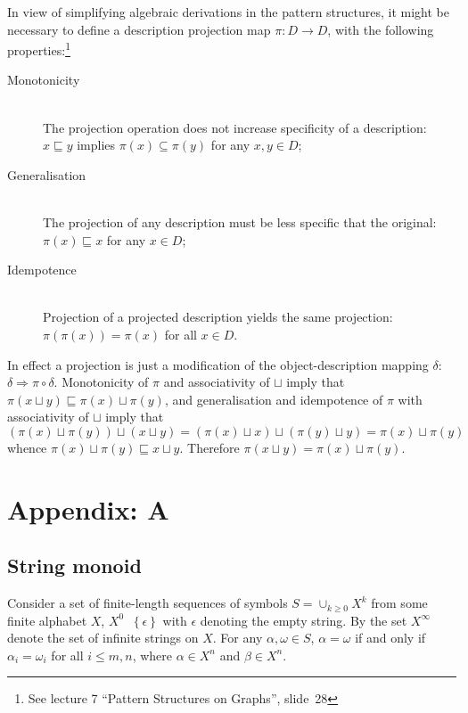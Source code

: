 \documentclass[a4paper]{article}
\newcommand{\obj}[1]{{\left\{ #1 \right \}}}
\newcommand{\brac}[1]{{\left ( #1 \right )}}
\newcommand{\defn}{\mathop{\overset{\Delta}{=}}\nolimits}
\begin{document}
In view of simplifying algebraic derivations in the pattern structures, it might be necessary to define a description projection map $\pi:D\to D$, with the following properties:\footnote{See lecture 7 ``Pattern Structures on Graphs'', slide~28} \begin{description}
	\item[Monotonicity] \hfill \\ The projection operation does not increase specificity of a description: $x\sqsubseteq y$ implies $\pi(x)\subseteq \pi(y)$ for any $x,y\in D$;
	\item[Generalisation] \hfill \\ The projection of any description must be less specific that the original: $\pi(x)\sqsubseteq x$ for any $x\in D$;
	\item[Idempotence] \hfill \\ Projection of a projected description yields the same projection: $\pi\brac{\pi(x)} = \pi(x)$ for all $x\in D$.
\end{description}
In effect a projection is just a modification of the object-description mapping $\delta$: $\delta \Rightarrow \pi \circ \delta$. Monotonicity of $\pi$ and associativity of $\sqcup$ imply that $\pi\brac{x\sqcup y}\sqsubseteq \pi(x)\sqcup\pi(y)$, and generalisation and idempotence of $\pi$ with associativity of $\sqcup$ imply that \[\brac{\pi(x)\sqcup\pi(y)}\sqcup (x\sqcup y) = \brac{\pi(x)\sqcup x}\sqcup \brac{\pi(y)\sqcup y} = \pi(x)\sqcup \pi(y)\] whence $\pi(x)\sqcup\pi(y)\sqsubseteq x\sqcup y$. Therefore $\pi\brac{x\sqcup y} = \pi(x)\sqcup\pi(y)$.




\section{Appendix: A} %
\label{sec:appendix_a}

\subsection{String monoid} %
\label{sub:string_monoid}

Consider a set of finite-length sequences of symbols $S=\cup_{k\geq0} X^k$ from some finite alphabet $X$, $X^0 \defn \obj{ \epsilon }$ with $\epsilon$ denoting the empty string. By the set $X^\infty$ denote the set of infinite strings on $X$. For any $\alpha, \omega\in S$, $\alpha=\omega$ if and only if $\alpha_i = \omega_i$ for all $i\leq m, n$, where $\alpha\in X^n$ and $\beta\in X^n$.
\end{document}
